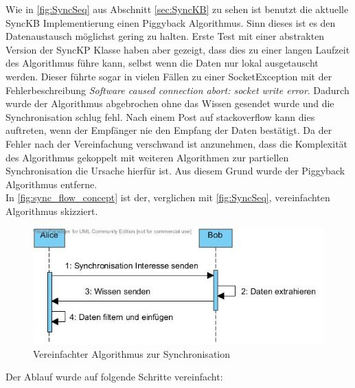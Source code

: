 \documentclass[a4paper]{article}
\begin{document}
	Wie in \autoref{fig:SyncSeq} aus Abschnitt \ref{sec:SyncKB} zu sehen ist
	benutzt die aktuelle SyncKB Implementierung einen Piggyback Algorithmus.
	Sinn dieses ist es den Datenaustausch möglichst gering zu halten. Erste Test
	mit einer abstrakten Version der SyncKP Klasse haben aber gezeigt, dass
	dies zu einer langen Laufzeit des Algorithmus führe kann, selbst wenn die
	Daten nur lokal ausgetauscht werden. Dieser führte sogar in vielen Fällen
	zu einer SocketException mit der Fehlerbeschreibung \emph{Software caused
	connection abort: socket write error}. Dadurch wurde der Algorithmus abgebrochen
	ohne das Wissen gesendet wurde und die Synchronisation schlug fehl. 
	Nach einem Post auf stackoverflow \cite{sockError} kann dies auftreten, wenn 
	der Empfänger nie den Empfang der Daten bestätigt. Da der Fehler nach der
	Vereinfachung verschwand ist anzunehmen, dass die Komplexität des Algorithmus
	gekoppelt mit weiteren Algorithmen zur partiellen Synchronisation die Ursache
	hierfür ist. Aus diesem Grund wurde der Piggyback Algorithmus entferne.\\
	
	In \autoref{fig:sync_flow_concept} ist der, verglichen mit \autoref{fig:SyncSeq},
	vereinfachten Algorithmus skizziert.
	
	\begin{figure}[H]
		\includegraphics[width=\linewidth]{../Bilder/sync_flow_concept.jpg}
		\caption{Vereinfachter Algorithmus zur Synchronisation}
		\label{fig:sync_flow_concept}
	\end{figure}
	
	Der Ablauf wurde auf folgende Schritte vereinfacht:
	
\end{document}
